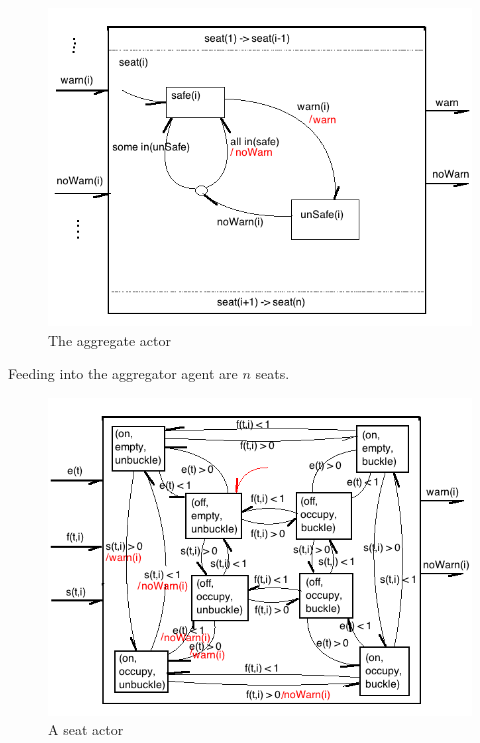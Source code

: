 \documentclass{article}
\begin{document}
\begin{figure}[h!]
\centering
\includegraphics[scale=0.7]{hw7_4b_actor_aggr.png}
\caption{The aggregate actor}
\label{fig:4b_actor_aggr}
\end{figure}


Feeding into the aggregator agent are $n$ seats.

\begin{figure}[h!]
\centering
\includegraphics[scale=0.7]{hw7_4b_actor_seat.png}
\caption{A seat actor}
\label{fig:4b_actor_seat}
\end{figure}
\end{document}
